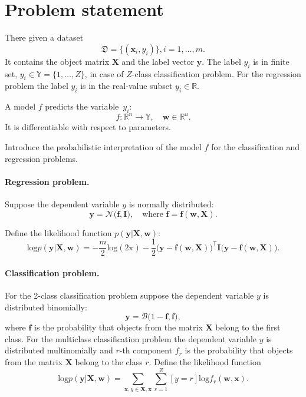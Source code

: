 \documentclass[12pt]{article}
\begin{document}
\section{Problem statement}
There given a dataset \begin{equation}\label{eq:dataset}\mathfrak{D} = \{(\mathbf{x}_i,y_i)\}, i = 1,\dots,m.\end{equation} It contains the object matrix $\mathbf{X}$ and the label vector  $\mathbf{y}$. The label  ${y_i}$ is in finite set, ${y}_i \in \mathbb{Y} = \{1, \dots, Z\}$, in case of $Z$-class classification problem. For the regression problem the label $y_i$ is in the real-value subset ${y_i} \in  \mathbb{R}$.

A model $f$ predicts the variable~$y_i$:
\[
	f:\mathbb{R}^n \to \mathbb{Y}, \quad \mathbf{w} \in \mathbb{R}^u.
\]
It is differentiable with respect to parameters.

Introduce the probabilistic interpretation of the model $f$ for the classification and regression problems.

\paragraph{Regression problem. }
Suppose the dependent variable $y$ is normally distributed:
\begin{equation}
\label{eq:reg}
\mathbf{y} = \mathcal{N}\bigl(\mathbf{f}, \mathbf{I}\bigr),\quad \text{where }\mathbf{f} = \mathbf{f}(\mathbf{w}, \mathbf{X}).
\end{equation}


Define the likelihood function $p(\mathbf{y}|\mathbf{X}, \mathbf{w})$:
\[
	\text{log}p(\mathbf{y}|\mathbf{X}, \mathbf{w}) =-\frac{m}{2}\text{log}(2\pi)   -\frac{1}{2}\bigl(\mathbf{y} - \mathbf{f}(\mathbf{w}, \mathbf{X}))^\mathsf{T}\mathbf{I}(\mathbf{y} - \mathbf{f}(\mathbf{w}, \mathbf{X})\bigr).
\] 

\paragraph{Classification problem. }
For the 2-class classification problem suppose the dependent variable $y$  is distributed binomially:
\begin{equation}
\label{eq:cl}
	\mathbf{y} = \mathcal{B}\bigl(1-\mathbf{f}, \mathbf{f}\bigr),
\end{equation}
where  $\mathbf{f}$ is the probability that objects from the matrix $\mathbf{X}$  belong to the first class.
For the multiclass classification problem the  dependent variable $y$  is distributed multinomially and $r$-th component ${f}_r$ is the probability that objects from the matrix $\mathbf{X}$  belong to the class $r$. Define the likelihood function
\[
	\text{log}p(\mathbf{y}|\mathbf{X}, \mathbf{w}) = \sum_{\mathbf{x}, y \in \mathbf{X}, \mathbf{x}} \sum_{r=1}^Z[y=r] \text{log}{f}_r(\mathbf{w}, \mathbf{x}).
\] 
\end{document}
